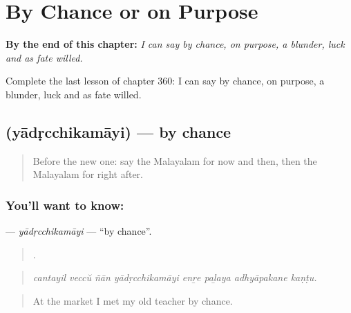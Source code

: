 
\chapter{By Chance or on Purpose}
\label{ch:ml-by-chance-or-on-purpose}

\begin{chapteropening}
\textbf{By the end of this chapter:} \emph{I can say by chance, on purpose, a blunder, luck and as fate willed.}

Complete the last lesson of chapter 360: I can say by chance, on purpose, a blunder, luck and as fate willed.
\end{chapteropening}

\section[\texorpdfstring{\ml{യാദൃച്ഛികമായി} (yādṛcchikamāyi)}{യാദൃച്ഛികമായി (yādṛcchikamāyi)}]{ (yādṛcchikamāyi) — by chance}

\label{lesson:ML-C360-yadrcchikamayi}



\begin{quote}
Before the new one: say the Malayalam for now and then, then the Malayalam for right after.
\end{quote}

\subsection*{You'll want to know: }
\textbf{} — \emph{yādṛcchikamāyi} — \textquotedblleft{}by chance\textquotedblright{}.

\begin{quote}
       .
\end{quote}

\begin{quote}
\emph{cantayil veccŭ ñān yādṛcchikamāyi enṟe paḻaya adhyāpakane kaṇṭu.}
\end{quote}

\begin{quote}
At the market I met my old teacher by chance.
\end{quote}

